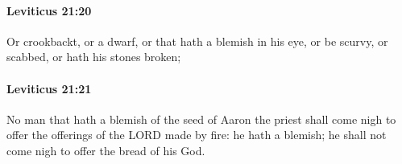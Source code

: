 		\paragraph{Leviticus 21:20} %
			\label{LEVITICUS-21-20}

			Or crookbackt, or a dwarf, or that hath a blemish in his eye, or be scurvy, or scabbed, or hath his stones broken;


		\paragraph{Leviticus 21:21} %
			\label{LEVITICUS-21-21}

			No man that hath a blemish of the seed of Aaron the priest shall come nigh to offer the offerings of the LORD made by fire: he hath a blemish; he shall not come nigh to offer the bread of his God.


